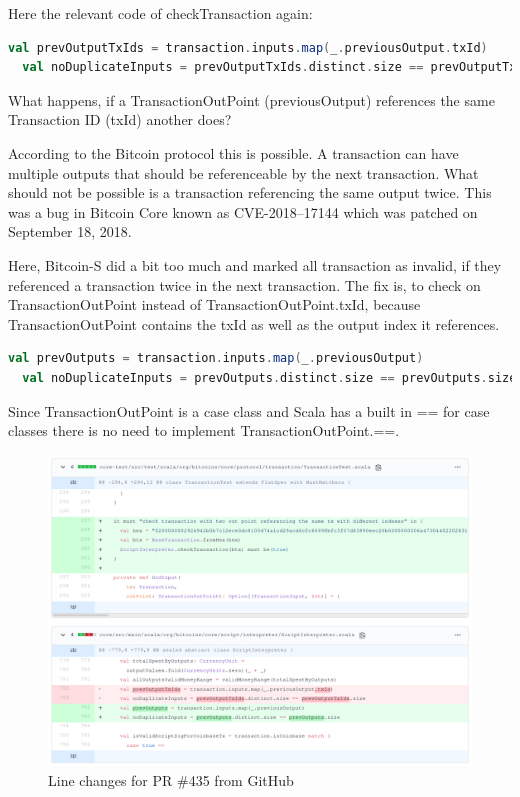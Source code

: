 Here the relevant code of checkTransaction again:
\begin{lstlisting}[language=scala]
  val prevOutputTxIds = transaction.inputs.map(_.previousOutput.txId)
  val noDuplicateInputs = prevOutputTxIds.distinct.size == prevOutputTxIds.size
\end{lstlisting}

What happens, if a TransactionOutPoint (previousOutput) references the same Transaction ID (txId) another does?

According to the Bitcoin protocol this is possible.
A transaction can have multiple outputs that should be referenceable by the next transaction.
What should not be possible is a transaction referencing the same output twice.
This was a bug in Bitcoin Core known as CVE-2018–17144 which was patched on September 18, 2018. \cite{cve201817144}

Here, Bitcoin-S did a bit too much and marked all transaction as invalid, if they referenced a transaction twice in the next transaction.
The fix is, to check on TransactionOutPoint instead of TransactionOutPoint.txId, because TransactionOutPoint contains the txId as well as the output index it references.
\begin{lstlisting}[language=scala]
  val prevOutputs = transaction.inputs.map(_.previousOutput)
  val noDuplicateInputs = prevOutputs.distinct.size == prevOutputs.size
\end{lstlisting}

Since TransactionOutPoint is a case class and Scala has a built in == for case classes there is no need to implement TransactionOutPoint.==.
\begin{figure}[H]
	\centering
		\includegraphics[scale=0.396]{images/bitcoin-s-pr.png}
	\caption{Line changes for PR \#435 from GitHub}
	\label{fig:output1}
\end{figure}

